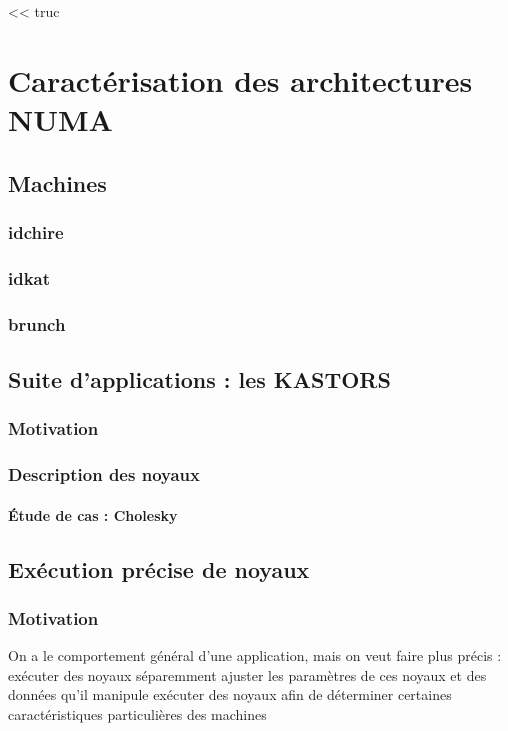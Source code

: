 
\begin{savequote}[6cm]
<< truc
\end{savequote}

\chapter{Caractérisation des architectures NUMA}\label{chap:contrib:characterization}
\chaptertoc

\section{Machines}

\subsection{idchire}
\subsection{idkat}
\subsection{brunch}

\section{Suite d'applications : les KASTORS}
\subsection{Motivation}
\subsection{Description des noyaux}
\subsubsection{Étude de cas : Cholesky}


\section{Exécution précise de noyaux}
\subsection{Motivation}

On a le comportement général d'une application, mais on veut faire plus précis :
exécuter des noyaux séparemment
ajuster les paramètres de ces noyaux et des données qu'il manipule
exécuter des noyaux afin de déterminer certaines caractéristiques particulières des machines


